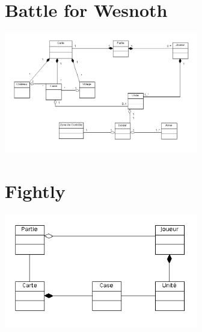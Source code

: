 \documentclass[a4paper,10pt]{report}
\begin{document}
	\section{Battle for Wesnoth}
	
		\includegraphics[width=320px]{diagrammes/Concept-Battle-of-Wesnoth.png}


	\section{Fightly}
	
		\includegraphics[width=320px]{diagrammes/concept-fightly.png}
\end{document}
